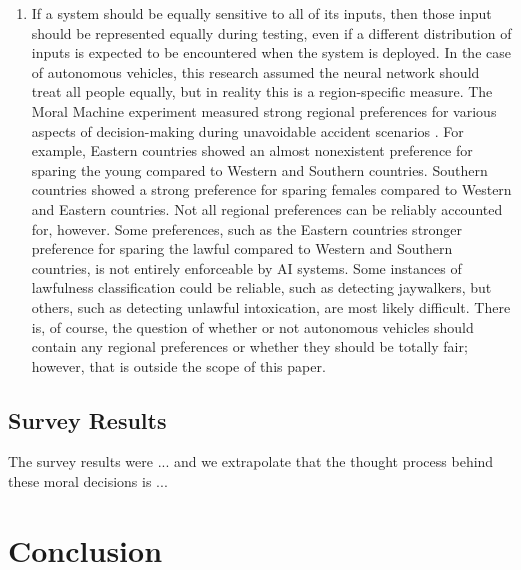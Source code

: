 \documentclass{report}
\begin{document}
\begin{enumerate}
\begin{enumerate}
        \item If a system should be equally sensitive to all of its inputs, then those input should
        be represented equally during testing, even if a different distribution of inputs is
        expected to be encountered when the system is deployed. In the case of autonomous vehicles,
        this research assumed the neural network should treat all people equally, but in reality
        this is a region-specific measure. The Moral Machine experiment measured strong regional
        preferences for various aspects of decision-making during unavoidable accident scenarios
        \cite{awad2018moral}. For example, Eastern countries showed an almost nonexistent preference
        for sparing the young compared to Western and Southern countries. Southern countries showed
        a strong preference for sparing females compared to Western and Eastern countries. Not all
        regional preferences can be reliably accounted for, however. Some preferences, such as the
        Eastern countries stronger preference for sparing the lawful compared to Western and
        Southern countries, is not entirely enforceable by AI systems. Some instances of lawfulness
        classification could be reliable, such as detecting jaywalkers, but others, such as
        detecting unlawful intoxication, are most likely difficult. There is, of course, the
        question of whether or not autonomous vehicles should contain any regional preferences or
        whether they should be totally fair; however, that is outside the scope of this paper.
    \end{enumerate}
\end{enumerate}
    
\section{Survey Results}

The survey results were ... and we extrapolate that the thought process behind these moral decisions
is ...

\chapter{Conclusion}
\end{document}
